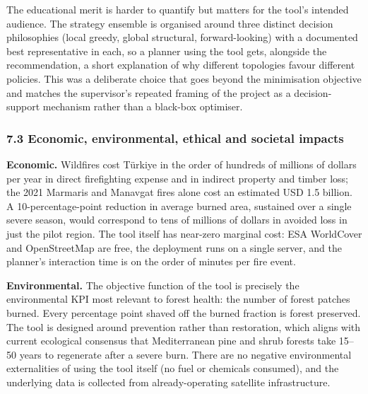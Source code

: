 \documentclass[
  11pt,
]{article}
\begin{document}
The educational merit is harder to quantify but matters for the tool's
intended audience. The strategy ensemble is organised around three
distinct decision philosophies (local greedy, global structural,
forward-looking) with a documented best representative in each, so a
planner using the tool gets, alongside the recommendation, a short
explanation of why different topologies favour different policies. This
was a deliberate choice that goes beyond the minimisation objective and
matches the supervisor's repeated framing of the project as a
decision-support mechanism rather than a black-box optimiser.

\subsubsection{7.3 Economic, environmental, ethical and societal
impacts}\label{economic-environmental-ethical-and-societal-impacts}

\textbf{Economic.} Wildfires cost Türkiye in the order of hundreds of
millions of dollars per year in direct firefighting expense and in
indirect property and timber loss; the 2021 Marmaris and Manavgat fires
alone cost an estimated USD 1.5 billion. A 10-percentage-point reduction
in average burned area, sustained over a single severe season, would
correspond to tens of millions of dollars in avoided loss in just the
pilot region. The tool itself has near-zero marginal cost: ESA
WorldCover and OpenStreetMap are free, the deployment runs on a single
server, and the planner's interaction time is on the order of minutes
per fire event.

\textbf{Environmental.} The objective function of the tool is precisely
the environmental KPI most relevant to forest health: the number of
forest patches burned. Every percentage point shaved off the burned
fraction is forest preserved. The tool is designed around prevention
rather than restoration, which aligns with current ecological consensus
that Mediterranean pine and shrub forests take 15--50 years to
regenerate after a severe burn. There are no negative environmental
externalities of using the tool itself (no fuel or chemicals consumed),
and the underlying data is collected from already-operating satellite
infrastructure.
\end{document}
